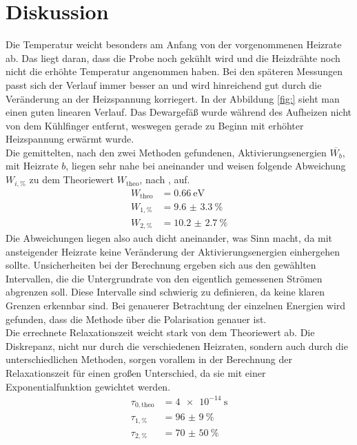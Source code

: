 \section{Diskussion}


Die Temperatur weicht besonders am Anfang von der vorgenommenen Heizrate ab. Das liegt daran, dass die Probe noch
gekühlt wird und die Heizdrähte noch nicht die erhöhte Temperatur angenommen haben. Bei den späteren Messungen passt sich der Verlauf immer besser an
und wird hinreichend gut durch die Veränderung an der Heizspannung korriegert. In der Abbildung \ref{fig:} sieht man einen guten linearen Verlauf.
Das Dewargefäß wurde während des Aufheizen nicht von dem Kühlfinger entfernt, weswegen gerade zu Beginn mit erhöhter Heizspannung erwärmt wurde.
\\
\newline
Die gemittelten, nach den zwei Methoden gefundenen, Aktivierungsenergien $\overline{W_{b}}$, mit Heizrate $b$,  liegen sehr nahe bei aneinander und weisen folgende Abweichung $W_{i,\%}$ zu dem Theoriewert $W_{\text{theo}}$, nach \cite{https://doi.org/10.1002/pssb.2220610223}, auf.
\begin{align*}
    W_{\text{theo}} &= \SI{0.66}{\electronvolt} \\
    W_{1,\%} &= \SI{9.6(33)}{\percent}  \\
    W_{2,\%} &= \SI{10.2(27)}{\percent}
\end{align*}
Die Abweichungen liegen also auch dicht aneinander, was Sinn macht, da mit ansteigender Heizrate keine Veränderung der Aktivierungsenergien einhergehen sollte.
Unsicherheiten bei der Berechnung ergeben sich aus den gewählten Intervallen, die die Untergrundrate von den eigentlich gemessenen Strömen abgrenzen soll.
Diese Intervalle sind schwierig zu definieren, da keine klaren Grenzen erkennbar sind.
Bei genauerer Betrachtung der einzelnen Energien wird gefunden, dass die Methode über die Polarisation genauer ist.
\\
\newline
Die errechnete Relaxationszeit weicht stark von dem Theoriewert ab.  
Die Diskrepanz, nicht nur durch die verschiedenen Heizraten, sondern auch durch die unterschiedlichen Methoden, sorgen vorallem 
in der Berechnung der Relaxationszeit für einen großen Unterschied, da sie mit einer Exponentialfunktion gewichtet werden.
\begin{align*}
    \tau_{0,\text{theo}} &= \SI{4e-14}{\second} \\
    \tau_{1,\%} &= \SI{96(9)}{\percent}  \\
    \tau_{2,\%} &= \SI{70(50)}{\percent}
\end{align*}
